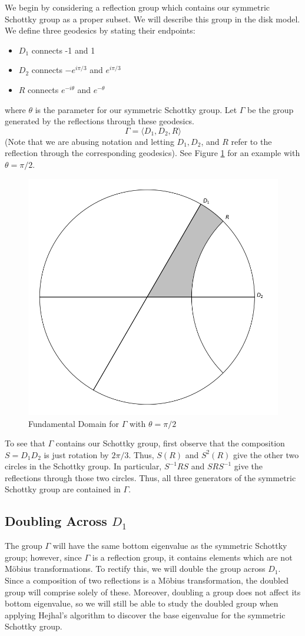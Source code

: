 \documentclass[]{article}
\begin{document}
We begin by considering a reflection group which contains our symmetric Schottky group as a proper subset.
We will describe this group in the disk model.
We define three geodesics by stating their endpoints:
\begin{itemize}
	\item $D_1$ connects -1 and 1
	\item $D_2$ connects $-e^{i\pi/3}$ and $e^{i\pi/3}$
	\item $R$ connects $e^{-i\theta}$ and $e^{-\theta}$
\end{itemize}
where $\theta$ is the parameter for our symmetric Schottky group.
Let $\Gamma$ be the group generated by the reflections through these geodesics.
$$
\Gamma = \langle D_1, D_2, R \rangle
$$
(Note that we are abusing notation and letting $D_1, D_2$, and $R$ refer to the reflection through the corresponding geodesics).
See Figure \ref{fd_reflection} for an example with $\theta = \pi/2$.
\begin{figure}
	\centering
	\includegraphics[width=0.5\linewidth]{reflection_group.png}
	\caption{Fundamental Domain for $\Gamma$ with $\theta = \pi/2$}
	\label{fd_reflection}
\end{figure}

To see that $\Gamma$ contains our Schottky group, first observe that the composition $S = D_1D_2$ is just rotation by $2\pi/3$.
Thus, $S(R)$ and $S^2(R)$ give the other two circles in the Schottky group.
In particular, $S^{-1}RS$ and $SRS^{-1}$ give the reflections through those two circles.
Thus, all three generators of the symmetric Schottky group are contained in $\Gamma$.

\subsection*{Doubling Across $D_1$}

The group $\Gamma$ will have the same bottom eigenvalue as the symmetric Schottky group; however, since $\Gamma$ is a reflection group, it contains elements which are not M\"obius transformations.
To rectify this, we will double the group across $D_1$.
Since a composition of two reflections is a M\"obius transformation, the doubled group will comprise solely of these.
Moreover, doubling a group does not affect its bottom eigenvalue, so we will still be able to study the doubled group when applying Hejhal's algorithm to discover the base eigenvalue for the symmetric Schottky group.
\end{document}
